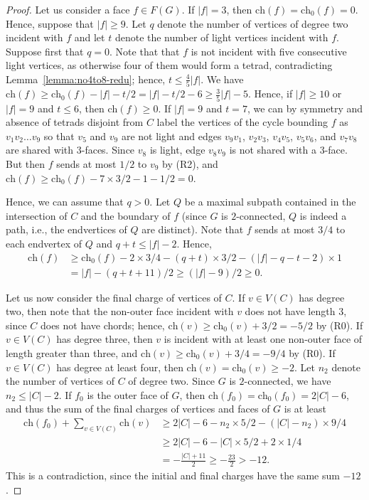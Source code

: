\documentclass[12pt,twoside,openright,a4paper]{book}
\newcommand{\initch}{\text{ch}_0}
\newcommand{\finch}{\text{ch}}
\begin{document}
\begin{proof}
Let us consider a face $f\in F(G)$.  If $|f|=3$, then $\finch(f)=\initch(f)=0$.  Hence, suppose that $|f|\ge 9$.
Let $q$ denote the number of vertices of degree two
incident with $f$ and let $t$ denote the number of light vertices incident with $f$.  Suppose first that $q=0$.
Note that that $f$ is not incident with five consecutive light vertices, as otherwise four of them would form a tetrad, contradicting Lemma~\ref{lemma:no4to8-redu};
hence, $t\le \frac{4}{5}|f|$.
We have $\finch(f)\ge \initch(f)-|f|-t/2=|f|-t/2-6\ge \frac{3}{5}|f|-5$. Hence, if $|f|\ge 10$ or $|f|=9$ and $t\le 6$, then $\finch(f)\ge 0$.
If $|f|=9$ and $t=7$, we can by symmetry and absence of tetrads disjoint from $C$
label the vertices of the cycle bounding $f$ as $v_1v_2\ldots v_9$ so that $v_5$ and $v_9$ are not light and edges $v_9v_1$,
$v_2v_3$, $v_4v_5$, $v_5v_6$, and $v_7v_8$ are shared with $3$-faces.  Since $v_8$ is light, edge $v_8v_9$ is not shared with a $3$-face.
But then $f$ sends at most $1/2$ to $v_9$ by (R2), and $\finch(f)\ge\initch(f)-7\times 3/2-1-1/2=0$.

Hence, we can assume that $q>0$.  Let $Q$ be a maximal subpath contained in the intersection of $C$ and the boundary of $f$
(since $G$ is $2$-connected, $Q$ is indeed a path, i.e., the endvertices of $Q$ are distinct).  Note that $f$ sends at most $3/4$
to each endvertex of $Q$ and $q+t\le |f|-2$.  Hence,
\begin{align*}
\finch(f)&\ge\initch(f)-2\times 3/4-(q+t)\times 3/2-(|f|-q-t-2)\times 1\\
&=|f|-(q+t+11)/2\ge(|f|-9)/2\ge 0.
\end{align*}

Let us now consider the final charge of vertices of $C$.  If $v\in V(C)$ has degree two, then note that the non-outer face incident
with $v$ does not have length $3$, since $C$ does not have chords; hence, $\finch(v)\ge\initch(v)+3/2=-5/2$ by (R0).
If $v\in V(C)$ has degree three, then $v$ is incident with at least one non-outer face of length greater than three, and
$\finch(v)\ge\initch(v)+3/4=-9/4$ by (R0).  If $v\in V(C)$ has degree at least four, then $\finch(v)=\initch(v)\ge -2$.
Let $n_2$ denote the number of vertices of $C$ of degree two.  Since $G$ is $2$-connected,
we have $n_2\le |C|-2$.  If $f_0$ is the outer face of $G$, then $\finch(f_0)=\initch(f_0)=2|C|-6$, and thus the sum of the final charges
of vertices and faces of $G$ is at least
\begin{align*}
\finch(f_0)+\sum_{v\in V(C)}\finch(v)&\ge 2|C|-6-n_2\times 5/2-(|C|-n_2)\times 9/4\\
&\ge 2|C|-6-|C|\times 5/2 + 2\times 1/4\\
&=-\frac{|C|+11}{2}\ge-\frac{23}{2}>-12.
\end{align*}
This is a contradiction, since the initial and final charges have the same sum $-12$.
\end{proof}
\end{document}
